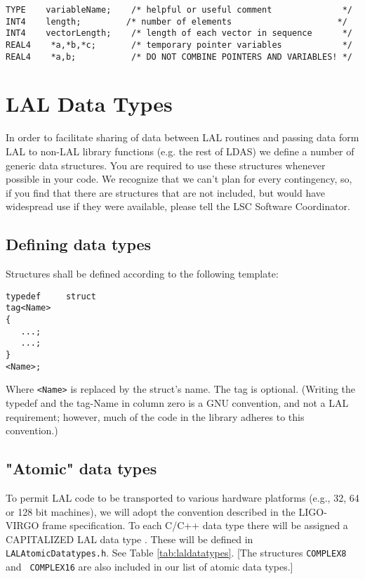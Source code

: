 \documentclass[]{ligodcc}
\begin{document}
{\footnotesize
\begin{verbatim}
TYPE    variableName;    /* helpful or useful comment              */
INT4    length;         /* number of elements                     */
INT4    vectorLength;    /* length of each vector in sequence      */
REAL4    *a,*b,*c;       /* temporary pointer variables            */
REAL4    *a,b;           /* DO NOT COMBINE POINTERS AND VARIABLES! */
\end{verbatim}}

\section{LAL Data Types}
\label{sec:laldatatypes}

In order to facilitate sharing of data between LAL routines and
passing data form LAL to non-LAL library functions (e.g. the rest of
LDAS) we define a number of generic data structures. You are required
to use these structures whenever possible in your code.  We recognize
that we can't plan for every contingency, so, if you find that there
are structures that are not included, but would have widespread use if
they were available, please tell the LSC Software Coordinator.

\subsection{Defining data types}
Structures shall be defined according to the following template:
\begin{verbatim}
typedef 	struct 		
tag<Name> 
{
   ...; 
   ...;
}
<Name>;
\end{verbatim}

Where {\tt <Name>} is replaced by the struct's name. The tag is
optional.  (Writing the typedef  and the tag-Name in column zero is a
GNU convention, and not a LAL requirement; however, much of the code
in the library adheres to this convention.)

\subsection{"Atomic" data types}
\label{atomic}

To permit LAL code to be transported to various hardware platforms
(e.g., 32, 64 or 128 bit machines), we will adopt the convention
described in the LIGO-VIRGO frame specification. To each C/C++ data
type there will be assigned a CAPITALIZED LAL data type . These
will be defined in {\tt LALAtomicDatatypes.h}.  See  Table
\ref{tab:laldatatypes}.  [The structures {\tt COMPLEX8} and {\tt
COMPLEX16} are also included in our list of atomic data types.]
\end{document}
